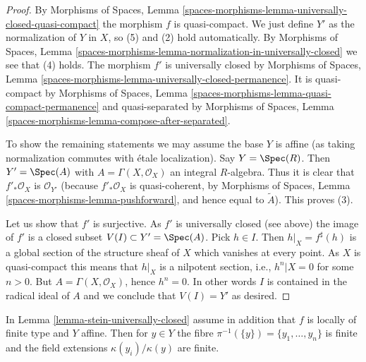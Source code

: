 \begin{proof}
By Morphisms of Spaces, Lemma
\ref{spaces-morphisms-lemma-universally-closed-quasi-compact}
the morphism $f$ is quasi-compact.
We just define $Y'$ as the normalization of $Y$ in $X$, so (5) and (2) hold
automatically. By
Morphisms of Spaces, Lemma
\ref{spaces-morphisms-lemma-normalization-in-universally-closed}
we see that (4) holds. The morphism $f'$ is universally closed by
Morphisms of Spaces, Lemma
\ref{spaces-morphisms-lemma-universally-closed-permanence}.
It is quasi-compact by
Morphisms of Spaces, Lemma
\ref{spaces-morphisms-lemma-quasi-compact-permanence}
and quasi-separated by
Morphisms of Spaces, Lemma
\ref{spaces-morphisms-lemma-compose-after-separated}.

\medskip\noindent
To show the remaining statements we may assume the base $Y$ is affine
(as taking normalization commutes with \'etale localization).
Say $Y = \Spec(R)$. Then $Y' = \Spec(A)$ with
$A = \Gamma(X, \mathcal{O}_X)$ an integral $R$-algebra.
Thus it is clear that $f'_*\mathcal{O}_X$
is $\mathcal{O}_{Y'}$ (because $f'_*\mathcal{O}_X$ is quasi-coherent,
by Morphisms of Spaces, Lemma
\ref{spaces-morphisms-lemma-pushforward},
and hence equal to $\widetilde{A}$). This proves (3).

\medskip\noindent
Let us show that $f'$ is surjective. As $f'$ is universally closed (see above)
the image of $f'$ is a closed subset
$V(I) \subset Y' = \Spec(A)$. Pick $h \in I$. Then
$h|_X = f^\sharp(h)$ is a global section of the structure sheaf of
$X$ which vanishes at every point. As $X$ is quasi-compact this means
that $h|_X$ is a nilpotent section, i.e., $h^n|X = 0$ for some $n > 0$.
But $A = \Gamma(X, \mathcal{O}_X)$, hence $h^n = 0$.
In other words $I$ is contained in the radical ideal of $A$ and we conclude
that $V(I) = Y'$ as desired.
\end{proof}

\begin{lemma}
\label{lemma-stein-universally-closed-residue-fields}
In Lemma \ref{lemma-stein-universally-closed} assume in addition that
$f$ is locally of finite type and $Y$ affine. Then for $y \in Y$ the fibre
$\pi^{-1}(\{y\}) = \{y_1, \ldots, y_n\}$ is finite and the field extensions
$\kappa(y_i)/\kappa(y)$ are finite.
\end{lemma}

